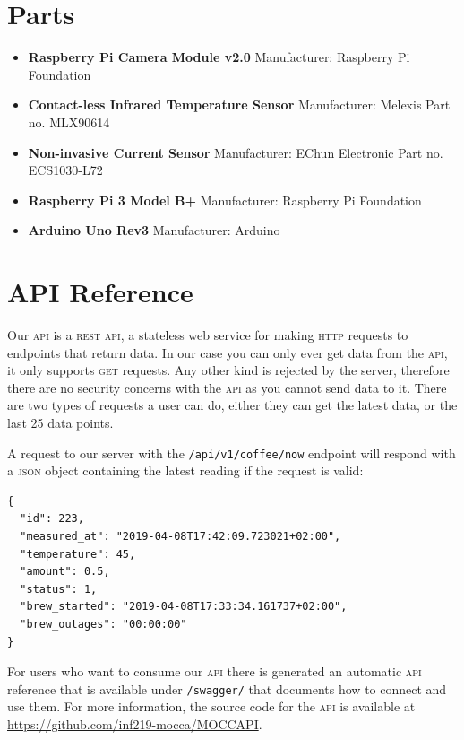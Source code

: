 \documentclass[12pt,a4paper,oneside,article]{memoir}
\numberwithin{equation}{chapter}
\begin{document}
\chapter{Parts}\label{sec:parts}
\begin{itemize}
\item \textbf{Raspberry Pi Camera Module v2.0} \newline
Manufacturer: Raspberry Pi Foundation

\item \textbf{Contact-less Infrared Temperature Sensor} \newline
Manufacturer: Melexis \newline
Part no. MLX90614

\item \textbf{Non-invasive Current Sensor} \newline
Manufacturer: EChun Electronic \newline
Part no. ECS1030-L72

\item \textbf{Raspberry Pi 3 Model B+} \newline
Manufacturer: Raspberry Pi Foundation 

\item \textbf{Arduino Uno Rev3} \newline
Manufacturer: Arduino

\end{itemize}

\chapter{API Reference}\label{sec:api-reference}
Our \textsc{api} is a \textsc{rest api}, a stateless web service for making
\textsc{http} requests to endpoints that return data. In our case you can only
ever get data from the \textsc{api}, it only supports \textsc{get} requests. Any
other kind is rejected by the server, therefore there are no security concerns
with the \textsc{api} as you cannot send data to it. There are two types of
requests a user can do, either they can get the latest data, or the last 25 data
points.

A request to our server with the \lstinline{/api/v1/coffee/now} endpoint will
respond with a \textsc{json} object containing the latest reading if the request
is valid:

\begin{lstlisting}
{
  "id": 223,
  "measured_at": "2019-04-08T17:42:09.723021+02:00",
  "temperature": 45,
  "amount": 0.5,
  "status": 1,
  "brew_started": "2019-04-08T17:33:34.161737+02:00",
  "brew_outages": "00:00:00"
}
\end{lstlisting}

For users who want to consume our \textsc{api} there is generated an automatic
\textsc{api} reference that is available under \lstinline{/swagger/} that
documents how to connect and use them. For more information, the source code for
the \textsc{api} is available at
{\small\url{https://github.com/inf219-mocca/MOCCAPI}}.

\clearpage{}
\renewcommand*{\UrlFont}{\footnotesize\ttfamily}
\printbibliography{}
\end{document}
